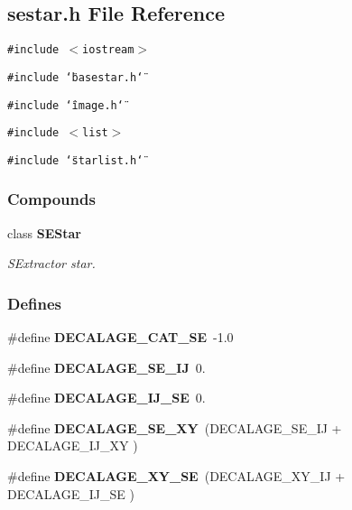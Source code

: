 \subsection{sestar.h File Reference}
\label{sestar_h}
{\tt \#include $<$iostream$>$}\par
{\tt \#include \char`\"{}basestar.h\char`\"{}}\par
{\tt \#include \char`\"{}image.h\char`\"{}}\par
{\tt \#include $<$list$>$}\par
{\tt \#include \char`\"{}starlist.h\char`\"{}}\par
\subsubsection*{Compounds}
\begin{CompactItemize}
\item 
class {\bf SEStar}
\begin{CompactList}\small\item\em SExtractor star.\item\end{CompactList}\end{CompactItemize}
\subsubsection*{Defines}
\begin{CompactItemize}
\item 
{}
\#define {\bf DECALAGE\_\-CAT\_\-SE}\ -1.0\label{sestar_h_a0}

\item 
{}
\#define {\bf DECALAGE\_\-SE\_\-IJ}\ 0.\label{sestar_h_a1}

\item 
{}
\#define {\bf DECALAGE\_\-IJ\_\-SE}\ 0.\label{sestar_h_a2}

\item 
{}
\#define {\bf DECALAGE\_\-SE\_\-XY}\ (DECALAGE\_\-SE\_\-IJ + DECALAGE\_\-IJ\_\-XY )\label{sestar_h_a3}

\item 
{}
\#define {\bf DECALAGE\_\-XY\_\-SE}\ (DECALAGE\_\-XY\_\-IJ + DECALAGE\_\-IJ\_\-SE )\label{sestar_h_a4}

\end{CompactItemize}

